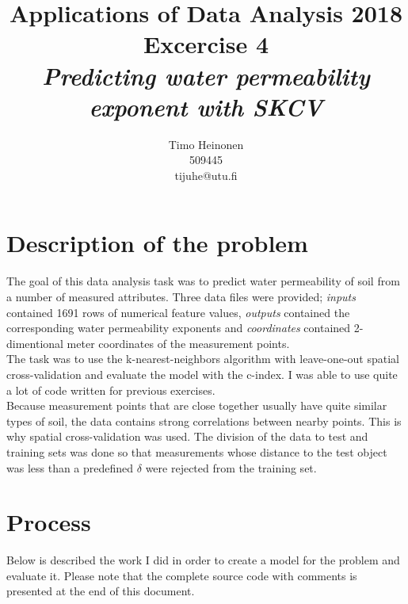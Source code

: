 \documentclass[a4paper]{article}
\title{Applications of Data Analysis 2018\\Excercise 4\\\emph{Predicting water permeability exponent with SKCV}}
\author{Timo Heinonen\\509445\\tijuhe@utu.fi}
\begin{document}
\fontfamily{\sfdefault}\selectfont
\maketitle

\section{Description of the problem}
The goal of this data analysis task was to predict water permeability of soil from a number of measured attributes. Three data files were provided; \emph{inputs} contained 1691 rows of numerical feature values, \emph{outputs} contained the corresponding water permeability exponents and \emph{coordinates} contained 2-dimentional meter coordinates of the measurement points.\\

The task was to use the k-nearest-neighbors algorithm with leave-one-out spatial cross-validation and evaluate the model with the c-index. I was able to use quite a lot of code written for previous exercises.\\

Because measurement points that are close together usually have quite similar types of soil, the data contains strong correlations between nearby points. This is why spatial cross-validation was used. The division of the data to test and training sets was done so that measurements whose distance to the test object was less than a predefined $\delta$ were rejected from the training set.


\section{Process}
Below is described the work I did in order to create a model for the problem and evaluate it. Please note that the complete source code with comments is presented at the end of this document.
\end{document}
